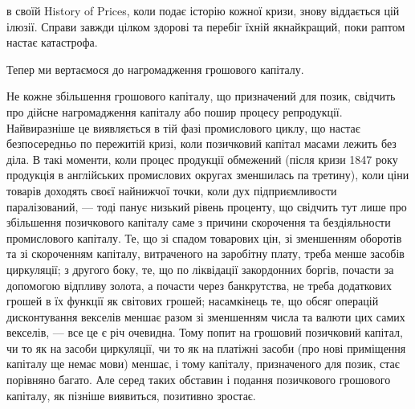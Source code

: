 \parcont{}  %
в своїй History of Prices, коли подає історію кожної кризи, знову віддається цій
ілюзії. Справи завжди цілком здорові та перебіг їхній якнайкращий, поки раптом
настає катастрофа.

Тепер ми вертаємося до нагромадження грошового капіталу.

Не кожне збільшення грошового капіталу, що призначений для позик, свідчить
про дійсне нагромадження капіталу або пошир процесу репродукції. Найвиразніше
це виявляється в тій фазі промислового циклу, що настає безпосередньо по пережитій
кризі, коли позичковий капітал масами лежить без діла. В такі моменти,
коли процес продукції обмежений (після кризи 1847 року продукція в англійських
промислових округах зменшилась па третину), коли ціни товарів доходять
своєї найнижчої точки, коли дух підприємливости паралізований, — тоді панує
низький рівень проценту, що свідчить тут лише про збільшення позичкового
капіталу саме з причини скорочення та бездіяльности промислового капіталу.
Те, що зі спадом товарових цін, зі зменшенням оборотів та зі скороченням
капіталу, витраченого на заробітну плату, треба менше засобів циркуляції;
з другого боку, те, що по ліквідації закордонних боргів, почасти за допомогою
відпливу золота, а почасти через банкрутства, не треба додаткових грошей
в їх функції як світових грошей; насамкінець те, що обсяг операцій дисконтування
векселів меншає разом зі зменшенням числа та валюти цих самих
векселів, — все це є річ очевидна. Тому попит на грошовий позичковий капітал,
чи то як на засоби циркуляції, чи то як на платіжні засоби (про нові приміщення
капіталу ще немає мови) меншає, і тому капіталу, призначеного для позик,
стає порівняно багато. Але серед таких обставин і подання позичкового грошового
капіталу, як пізніше виявиться, позитивно зростає.

